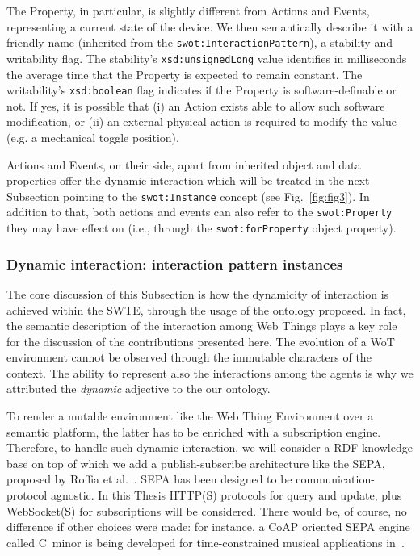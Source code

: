 The Property, in particular, is slightly different from Actions and Events, representing a current state of the device. We then semantically describe it with a friendly name (inherited from the \texttt{swot:InteractionPattern}), a stability and writability flag. The stability's \texttt{xsd:unsignedLong} value identifies in milliseconds the average time that the Property is expected to remain constant. The writability's \texttt{xsd:boolean} flag indicates if the Property is software-definable or not. If yes, it is possible that (i) an Action exists able to allow such software modification, or (ii) an external physical action is required to modify the value (e.g. a mechanical toggle position).

Actions and Events, on their side, apart from inherited object and data properties offer the dynamic interaction which will be treated in the next Subsection pointing to the \texttt{swot:Instance} concept (see Fig.~\ref{fig:fig3}). In addition to that, both actions and events can also refer to the \texttt{swot:Property} they may have effect on (i.e., through the \texttt{swot:forProperty} object property). 

\subsubsection{\textsf{Dynamic interaction: interaction pattern instances}}
The core discussion of this Subsection is how the dynamicity of interaction is achieved within the SWTE, through the usage of the ontology proposed. In fact, the semantic description of the interaction among Web Things plays a key role for the discussion of the contributions presented here. The evolution of a WoT environment cannot be observed through the immutable characters of the context. The ability to represent also the interactions among the agents is why we attributed the \textit{dynamic} adjective to the our ontology.

To render a mutable environment like the Web Thing Environment over a semantic platform, the latter has to be enriched with a subscription engine. Therefore, to handle such dynamic interaction, we will consider a RDF knowledge base on top of which we add a publish-subscribe architecture like the SEPA, proposed by Roffia et al.~\cite{roffia2016semantic}. SEPA has been designed to be communication-protocol agnostic. In this Thesis HTTP(S) protocols for query and update, plus WebSocket(S) for subscriptions will be considered. There would be, of course, no difference if other choices were made: for instance, a CoAP oriented SEPA  engine called C~minor is being developed for time-constrained musical applications in~\cite{viola2018cminor}.

